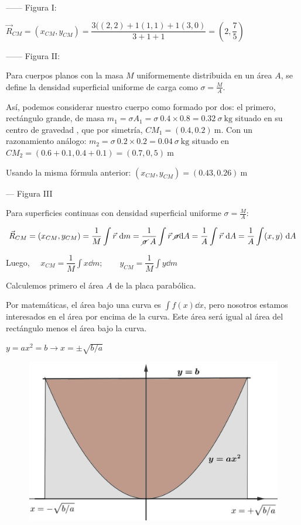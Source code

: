 ------ Figura I:

$\vec R_{CM}=(x_{CM},y_{CM})=\dfrac {3((2,2)+1(1,1)+1(3,0)}{3+1+1}=\left( 2, \dfrac 7 5 \right)$

------ Figura II:

Para cuerpos planos  con la masa $M$ uniformemente distribuida en un área $A$, se define la densidad superficial uniforme de carga como $\sigma =\frac M A$. 

Así, podemos considerar nuestro cuerpo como formado por dos: el primero, rectángulo grande, de masa  $m_1= \sigma A_1=\sigma  \ 0.4 \times 0.8=0.32 \ \sigma\  \text{kg}$ situado en su centro de gravedad , que por simetría, $CM_{1}=(0.4,0.2)\ \text{m}$. Con un razonamiento análogo: $m_2=\sigma \ 0.2 \times 0.2=0.04 \ \sigma \ \text{kg}$ situado en $CM_2=(0.6+0.1, 0.4+0.1)=(0.7,0,5)\ \text{m}$

Usando la misma fórmula anterior: $(x_{CM},y_{CM})=(0.43,0.26)\ \text{m}$

--- Figura III

Para superficies continuas con densidad superficial uniforme $\sigma=\frac M A$:

$\displaystyle \vec R_{CM}=(x_{CM},y_{CM})=\dfrac 1 M \int \vec r \ \dd m
= \dfrac 1 {\cancel{\sigma} \ A} \int \vec r \ \cancel{\sigma} \dd A= \dfrac  1 A \int \vec r \ \dd A=
\dfrac 1 A \int (x,y) \ \dd A $

Luego, $\displaystyle \quad x_{CM}=\dfrac 1 M \int x \dd m;\qquad y_{CM}=\dfrac 1 M \int y \dd m$

Calculemos primero el área $A$ de la placa parabólica. 

\begin{multicols}{2}
Por matemáticas, el área bajo una curva es $\int f(x)\dd x$, pero nosotros estamos interesados en el área por encima de la curva. Este área será igual al área del rectángulo menos el área bajo la curva.

$y=ax^2=b \to x=\pm \sqrt{b/a}$
\begin{figure}[H]
	\centering
	\includegraphics[width=.5\textwidth]{imagenes/imagenes12/T12IM07.png}
\end{figure}
\end{multicols}

